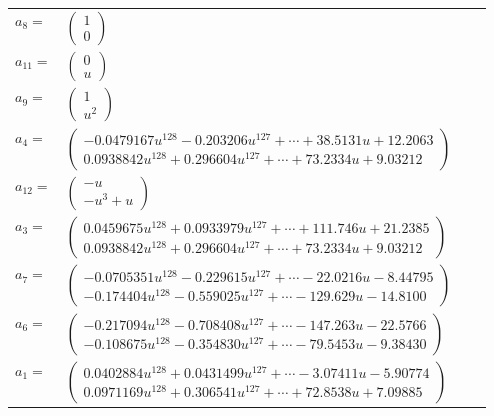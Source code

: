 \documentclass[1p]{elsarticle_modified}
\theoremstyle{definition}
\begin{document}
\begin{tabular}{m{7pt} m{180pt} m{7pt} m{180pt} }
\flushright $a_{8}=$&$\begin{pmatrix}1\\0\end{pmatrix}$ \\
\flushright $a_{11}=$&$\begin{pmatrix}0\\u\end{pmatrix}$ \\
\flushright $a_{9}=$&$\begin{pmatrix}1\\u^2\end{pmatrix}$ \\
\flushright $a_{4}=$&$\begin{pmatrix}-0.0479167 u^{128}-0.203206 u^{127}+\cdots+38.5131 u+12.2063\\0.0938842 u^{128}+0.296604 u^{127}+\cdots+73.2334 u+9.03212\end{pmatrix}$ \\
\flushright $a_{12}=$&$\begin{pmatrix}- u\\- u^3+u\end{pmatrix}$ \\
\flushright $a_{3}=$&$\begin{pmatrix}0.0459675 u^{128}+0.0933979 u^{127}+\cdots+111.746 u+21.2385\\0.0938842 u^{128}+0.296604 u^{127}+\cdots+73.2334 u+9.03212\end{pmatrix}$ \\
\flushright $a_{7}=$&$\begin{pmatrix}-0.0705351 u^{128}-0.229615 u^{127}+\cdots-22.0216 u-8.44795\\-0.174404 u^{128}-0.559025 u^{127}+\cdots-129.629 u-14.8100\end{pmatrix}$ \\
\flushright $a_{6}=$&$\begin{pmatrix}-0.217094 u^{128}-0.708408 u^{127}+\cdots-147.263 u-22.5766\\-0.108675 u^{128}-0.354830 u^{127}+\cdots-79.5453 u-9.38430\end{pmatrix}$ \\
\flushright $a_{1}=$&$\begin{pmatrix}0.0402884 u^{128}+0.0431499 u^{127}+\cdots-3.07411 u-5.90774\\0.0971169 u^{128}+0.306541 u^{127}+\cdots+72.8538 u+7.09885\end{pmatrix}$ \\

\end{tabular}
\end{document}
